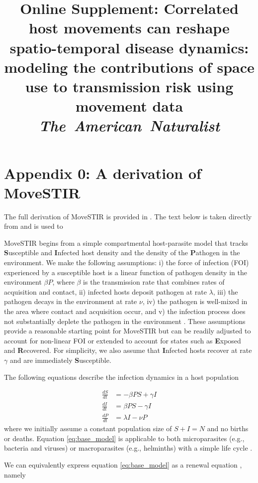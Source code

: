 \documentclass[11pt]{article}
\title{Online Supplement: Correlated host movements can reshape spatio-temporal disease dynamics: modeling the contributions of space use to transmission risk using movement data \\
\textit{The~American~Naturalist} }
\date{}
\begin{document}
\linenumbers

\section*{Appendix 0: A derivation of MoveSTIR}

The full derivation of MoveSTIR is provided in \cite{Wilber2022}. The text below is taken directly from \cite{Wilber2022} and is used to 

MoveSTIR begins from a simple compartmental host-parasite model that tracks \textbf{S}usceptible and \textbf{I}nfected host density and the density of the \textbf{P}athogen in the environment. We make the following assumptions: i) the force of infection (FOI) experienced by a susceptible host is a linear function of pathogen density in the environment $\beta P$, where $\beta$ is the transmission rate that combines rates of acquisition and contact, ii) infected hosts deposit pathogen at rate $\lambda$, iii) the pathogen decays in the environment at rate $\nu$, iv) the pathogen is well-mixed in the area where contact and acquisition occur, and v) the infection process does not substantially deplete the pathogen in the environment \citep{Dwyer1997a,Fenton2015}.  These assumptions provide a reasonable starting point for MoveSTIR but can be readily adjusted to account for non-linear FOI or extended to account for states such as \textbf{E}xposed and \textbf{R}ecovered. For simplicity, we also assume that \textbf{I}nfected hosts recover at rate $\gamma$ and are immediately \textbf{S}usceptible.

The following equations describe the infection dynamics in a host population

\begin{equation}
    \begin{aligned}
        \frac{d S}{dt} &= - \beta P S + \gamma I  \\
        \frac{d I}{dt} &= \beta P S - \gamma I \\
        \frac{d P}{dt} &= \lambda I - \nu P
     \end{aligned}
     \label{eq:base_model}
\end{equation}
where we initially assume a constant population size of $S + I = N$ and no births or deaths. Equation \ref{eq:base_model} is applicable to both microparasites (e.g., bacteria and viruses) or macroparasites (e.g., helminths) with a simple life cycle \citep[e.g.,][]{Fenton2015}.

We can equivalently express equation \ref{eq:base_model} as a renewal equation \citep{VandenDriessche2002}, namely
\end{document}
